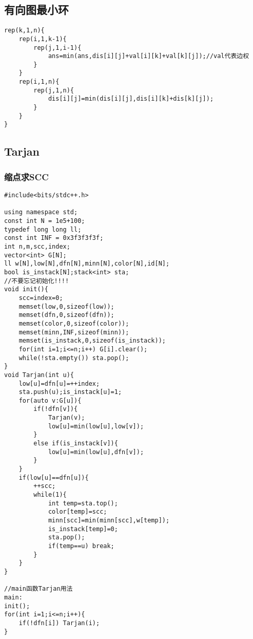 \documentclass[twocolumn,a4]{article}
\begin{document}
\subsection{有向图最小环}
\begin{lstlisting}
rep(k,1,n){
    rep(i,1,k-1){
        rep(j,1,i-1){
            ans=min(ans,dis[i][j]+val[i][k]+val[k][j]);//val代表边权
        }
    }
    rep(i,1,n){
        rep(j,1,n){
            dis[i][j]=min(dis[i][j],dis[i][k]+dis[k][j]);
        }
    }
}
\end{lstlisting}
\subsection{Tarjan}
\subsubsection{缩点求SCC}
\begin{lstlisting}
#include<bits/stdc++.h>

using namespace std;
const int N = 1e5+100;
typedef long long ll;
const int INF = 0x3f3f3f3f;
int n,m,scc,index;
vector<int> G[N];
ll w[N],low[N],dfn[N],minn[N],color[N],id[N];
bool is_instack[N];stack<int> sta;
//不要忘记初始化!!!!
void init(){
	scc=index=0;
	memset(low,0,sizeof(low));
	memset(dfn,0,sizeof(dfn));
	memset(color,0,sizeof(color));
	memset(minn,INF,sizeof(minn));
	memset(is_instack,0,sizeof(is_instack));
	for(int i=1;i<=n;i++) G[i].clear();
	while(!sta.empty()) sta.pop();
}
void Tarjan(int u){
	low[u]=dfn[u]=++index;
	sta.push(u);is_instack[u]=1;
	for(auto v:G[u]){
		if(!dfn[v]){
			Tarjan(v);
			low[u]=min(low[u],low[v]);
		}
		else if(is_instack[v]){
			low[u]=min(low[u],dfn[v]);
		}
	}
	if(low[u]==dfn[u]){
		++scc;
		while(1){
			int temp=sta.top();
			color[temp]=scc;
			minn[scc]=min(minn[scc],w[temp]);
			is_instack[temp]=0;
			sta.pop();
			if(temp==u) break;
		}
	}
}

//main函数Tarjan用法
main:
init();
for(int i=1;i<=n;i++){
	if(!dfn[i]) Tarjan(i);
}
\end{lstlisting}
\end{document}
